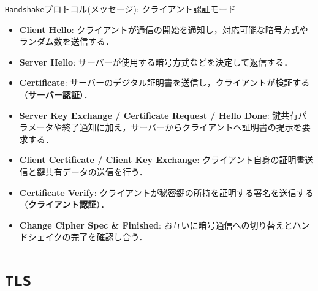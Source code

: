 \documentclass[11pt, aspectratio=169]{beamer}
\begin{document}
\begin{frame}{\texttt{Handshake}プロトコル(メッセージ): クライアント認証モード}
  \begin{itemize}
    \item \textbf{Client Hello}: クライアントが通信の開始を通知し，対応可能な暗号方式やランダム数を送信する．
    \item \textbf{Server Hello}: サーバーが使用する暗号方式などを決定して返信する．
    \item \textbf{Certificate}: サーバーのデジタル証明書を送信し，クライアントが検証する（\textbf{サーバー認証}）．
    \item \textbf{Server Key Exchange / Certificate Request / Hello Done}: 鍵共有パラメータや終了通知に加え，サーバーからクライアントへ証明書の提示を要求する．
    \item \textbf{Client Certificate / Client Key Exchange}: クライアント自身の証明書送信と鍵共有データの送信を行う．
    \item \textbf{Certificate Verify}: クライアントが秘密鍵の所持を証明する署名を送信する（\textbf{クライアント認証}）．
    \item \textbf{Change Cipher Spec \& Finished}: お互いに暗号通信への切り替えとハンドシェイクの完了を確認し合う．
  \end{itemize}
\end{frame}

\section{\texttt{TLS}}
\end{document}
